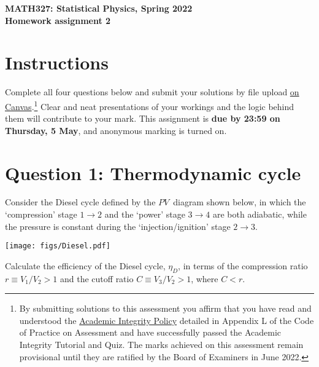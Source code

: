 \documentclass[12 pt]{article} %
\begin{document}
\newcommand{\thisweek}{MATH327 Homework 2}
\newcommand{\moddate}{Last modified 23 Apr.~2022}
\begin{center}
  {\Large \textbf{MATH327: Statistical Physics, Spring 2022}} \\[12 pt]
  {\Large \textbf{Homework assignment 2}} \\[24 pt]
\end{center}

\section*{Instructions}
Complete all four questions below and submit your solutions by file upload \href{https://liverpool.instructure.com/courses/47333/assignments/178544}{on Canvas}.\footnote{By submitting solutions to this assessment you affirm that you have read and understood the \href{https://www.liverpool.ac.uk/media/livacuk/tqsd/code-of-practice-on-assessment/appendix_L_cop_assess.pdf}{Academic Integrity Policy} detailed in Appendix L of the Code of Practice on Assessment and have successfully passed the Academic Integrity Tutorial and Quiz.  The marks achieved on this assessment remain provisional until they are ratified by the Board of Examiners in June 2022.}
Clear and neat presentations of your workings and the logic behind them will contribute to your mark.
This assignment is \textbf{due by 23:59 on Thursday, 5 May}, and anonymous marking is turned on.



\vfill
\section*{Question 1: Thermodynamic cycle}
Consider the Diesel cycle defined by the $PV$~diagram shown below, in which the `compression' stage $1 \to 2$ and the `power' stage $3 \to 4$ are both adiabatic, while the pressure is constant during the `injection/ignition' stage $2 \to 3$.

\begin{center}\texttt{[image: figs/Diesel.pdf]}\end{center}

Calculate the efficiency of the Diesel cycle, $\eta_D$, in terms of the compression ratio $r \equiv V_1 / V_2 > 1$ and the cutoff ratio $C \equiv V_3 / V_2 > 1$, where $C < r$.
\end{document}
